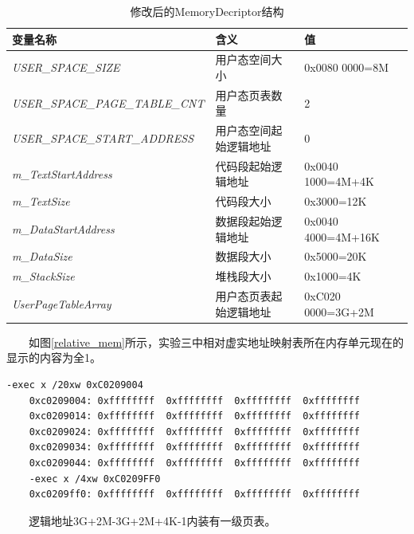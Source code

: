 \begin{table}[!h]
    \centering
 \begin{tabular}{lll}\toprule
    变量名称      &含义         &值        \\\midrule
   \textit{USER\_SPACE\_SIZE }&用户态空间大小            &0x0080 0000=8M               \\
   \textit{USER\_SPACE\_PAGE\_TABLE\_CNT     }&用户态页表数量            &2                            \\
   \textit{USER\_SPACE\_START\_ADDRESS       }&用户态空间起始逻辑地址        &0                            \\
   \textit{m\_TextStartAddress               }&代码段起始逻辑地址      &0x0040 1000=4M+4K                      \\
   \textit{m\_TextSize                       }&代码段大小          &0x3000=12K                      \\
   \textit{m\_DataStartAddress               }&数据段起始逻辑地址      &0x0040 4000=4M+16K                      \\
   \textit{m\_DataSize                       }&数据段大小          &0x5000=20K                      \\
   \textit{m\_StackSize                       }&堆栈段大小          &0x1000=4K                      \\
   \textit{UserPageTableArray             }&用户态页表起始逻辑地址      &0xC020 0000=3G+2M                  \\
   \bottomrule
\end{tabular}
\caption{修改后的MemoryDecriptor结构}\label{MemoryDescriptorAfter}
\end{table}

　　如图\ref{relative_mem}所示，实验三中相对虚实地址映射表所在内存单元现在的显示的内容为全1。

\begin{Verbatim}[frame=single,fontsize=\small]
    -exec x /20xw 0xC0209004
    0xc0209004:	0xffffffff	0xffffffff	0xffffffff	0xffffffff
    0xc0209014:	0xffffffff	0xffffffff	0xffffffff	0xffffffff
    0xc0209024:	0xffffffff	0xffffffff	0xffffffff	0xffffffff
    0xc0209034:	0xffffffff	0xffffffff	0xffffffff	0xffffffff
    0xc0209044:	0xffffffff	0xffffffff	0xffffffff	0xffffffff
    -exec x /4xw 0xC0209FF0
    0xc0209ff0:	0xffffffff	0xffffffff	0xffffffff	0xffffffff
\end{Verbatim}
\label{relative_mem}

　　逻辑地址3G+2M-3G+2M+4K-1内装有一级页表。


